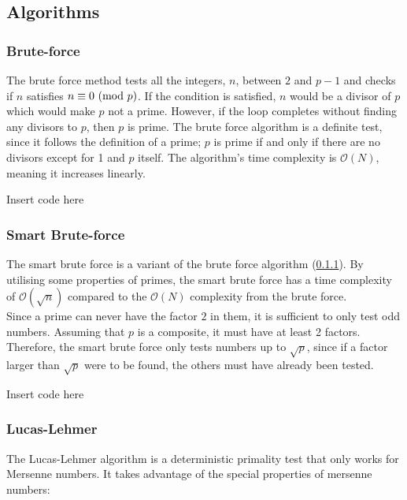 \documentclass[main.tex]{subfiles}
\begin{document}
\subsection{Algorithms}

\subsubsection{Brute-force} \label{brute} The brute force method tests all the
integers, $n$, between $2$ and $p-1$ and checks if $n$ satisfies $n \equiv 0
\ (\mathrm{mod}\ p)$. If the condition is satisfied, $n$ would be a divisor of $p$ which
would make $p$ not a prime. However, if the loop completes without finding any
divisors to $p$, then $p$ is prime. The brute force algorithm is a definite
test, since it follows the definition of a prime; $p$ is prime if and only if
there are no divisors except for 1 and $p$ itself. The algorithm's time
complexity is $\mathcal{O}(N)$, meaning it increases linearly. \newline

\begin{python}
  Insert code here
\end{python}

\subsubsection{Smart Brute-force}
The smart brute force is a variant of the brute force algorithm (\ref{brute}).
By utilising some properties of primes, the smart brute force has a time
complexity of $\mathcal{O}(\sqrt{n})$ compared to the $\mathcal{O}(N)$
complexity from the brute force. \\

Since a prime can never have the factor $2$ in them, it is sufficient to only
test odd numbers. Assuming that $p$ is a composite, it must have at least 2
factors. Therefore, the smart brute force only tests numbers up to $\sqrt{p}$,
since if a factor larger than $\sqrt{p}$ were to be found, the others must have
already been tested. \newline

\begin{python}
  Insert code here
\end{python}

\subsubsection{Lucas-Lehmer}
The Lucas-Lehmer algorithm \cite{algh:lucas} is a deterministic primality test
that only works for Mersenne numbers. It takes advantage of the special
properties of mersenne numbers: \newline
\end{document}
